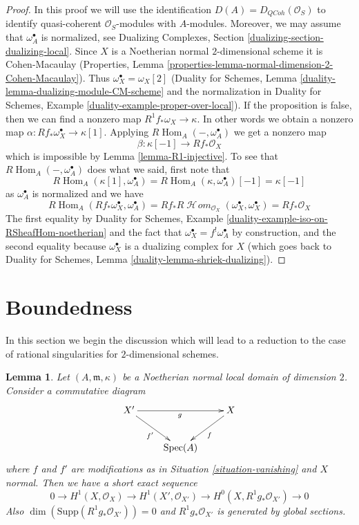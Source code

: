 \documentclass{stacks-project}
\theoremstyle{plain}
\newtheorem{lemma}[subsection]{Lemma}
\theoremstyle{definition}
\theoremstyle{remark}
\numberwithin{equation}{subsection}
\def\Spec{\mathop{\mathrm{Spec}}}
\def\Hom{\mathop{\mathrm{Hom}}\nolimits}
\def\SheafHom{\mathop{\mathcal{H}\!\mathit{om}}\nolimits}
\def\QCoh{\mathit{QCoh}}
\begin{document}
\begin{proof}
In this proof we will use the identification $D(A) = D_\QCoh(\mathcal{O}_S)$
to identify quasi-coherent $\mathcal{O}_S$-modules with $A$-modules.
Moreover, we may assume that $\omega_A^\bullet$ is normalized, see
Dualizing Complexes, Section \ref{dualizing-section-dualizing-local}.
Since $X$ is a Noetherian normal $2$-dimensional scheme
it is Cohen-Macaulay (Properties, Lemma
\ref{properties-lemma-normal-dimension-2-Cohen-Macaulay}).
Thus $\omega_X^\bullet = \omega_X[2]$ (Duality for Schemes, Lemma
\ref{duality-lemma-dualizing-module-CM-scheme} and the
normalization in Duality for Schemes, Example
\ref{duality-example-proper-over-local}).
If the proposition is false, then we can find a nonzero map
$R^1f_*\omega_X \to \kappa$. In other words we obtain a nonzero map
$\alpha : Rf_*\omega_X^\bullet \to \kappa[1]$.
Applying $R\Hom_A(-, \omega_A^\bullet)$ we get a nonzero map
$$
\beta : \kappa[-1] \longrightarrow Rf_*\mathcal{O}_X
$$
which is impossible by Lemma \ref{lemma-R1-injective}.
To see that $R\Hom_A(-, \omega_A^\bullet)$ does what we said, first
note that
$$
R\Hom_A(\kappa[1], \omega_A^\bullet) =
R\Hom_A(\kappa, \omega_A^\bullet)[-1] =
\kappa[-1]
$$
as $\omega_A^\bullet$ is normalized and we have
$$
R\Hom_A(Rf_*\omega_X^\bullet, \omega_A^\bullet) =
Rf_*R\SheafHom_{\mathcal{O}_X}(\omega_X^\bullet, \omega_X^\bullet) =
Rf_*\mathcal{O}_X
$$
The first equality by
Duality for Schemes, Example \ref{duality-example-iso-on-RSheafHom-noetherian}
and the fact that $\omega_X^\bullet = f^!\omega_A^\bullet$
by construction, and the second equality because $\omega_X^\bullet$
is a dualizing complex for $X$ (which goes back to
Duality for Schemes, Lemma \ref{duality-lemma-shriek-dualizing}).
\end{proof}





\section{Boundedness}
\label{section-bounded}

\noindent
In this section we begin the discussion which will lead to a reduction to
the case of rational singularities for $2$-dimensional schemes.

\begin{lemma}
\label{lemma-exact-sequence}
Let $(A, \mathfrak m, \kappa)$ be a Noetherian normal local domain
of dimension $2$. Consider a commutative diagram
$$
\xymatrix{
X' \ar[rd]_{f'} \ar[rr]_g & & X \ar[ld]^f \\
& \Spec(A)
}
$$
where $f$ and $f'$ are modifications as in Situation \ref{situation-vanishing}
and $X$ normal. Then we have a short exact sequence
$$
0 \to H^1(X, \mathcal{O}_X) \to H^1(X', \mathcal{O}_{X'}) \to
H^0(X, R^1g_*\mathcal{O}_{X'}) \to 0
$$
Also $\dim(\text{Supp}(R^1g_*\mathcal{O}_{X'})) = 0$
and $R^1g_*\mathcal{O}_{X'}$ is generated by global sections.
\end{lemma}
\end{document}
